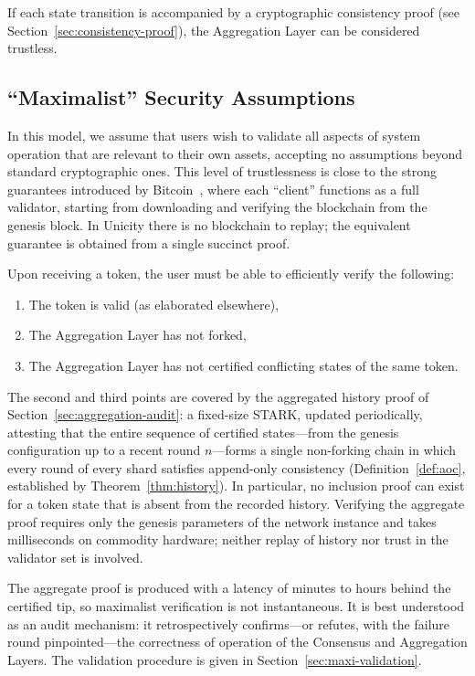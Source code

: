 \documentclass[twocolumn]{article}
\begin{document}
If each state transition is accompanied by a cryptographic consistency proof (see Section~\ref{sec:consistency-proof}), the Aggregation Layer can be considered trustless.


\subsection{``Maximalist'' Security Assumptions}
\label{sec:maximalist}

In this model, we assume that users wish to validate all aspects of system operation that are relevant to their own assets, accepting no assumptions beyond standard cryptographic ones. This level of trustlessness is close to the strong guarantees introduced by Bitcoin~\cite{bitcoin}, where each ``client'' functions as a full validator, starting from downloading and verifying the blockchain from the genesis block. In Unicity there is no blockchain to replay; the equivalent guarantee is obtained from a single succinct proof.

Upon receiving a token, the user must be able to efficiently verify the following:

\begin{enumerate}[nosep]
    \item The token is valid (as elaborated elsewhere),
    \item The Aggregation Layer has not forked,
    \item The Aggregation Layer has not certified conflicting states of the same token.
\end{enumerate}

The second and third points are covered by the aggregated history proof of Section~\ref{sec:aggregation-audit}: a fixed-size STARK, updated periodically, attesting that the entire sequence of certified states---from the genesis configuration up to a recent round $n$---forms a single non-forking chain in which every round of every shard satisfies append-only consistency (Definition~\ref{def:aoc}, established by Theorem~\ref{thm:history}). In particular, no inclusion proof can exist for a token state that is absent from the recorded history. Verifying the aggregate proof requires only the genesis parameters of the network instance and takes milliseconds on commodity hardware; neither replay of history nor trust in the validator set is involved.

The aggregate proof is produced with a latency of minutes to hours behind the certified tip, so maximalist verification is not instantaneous. It is best understood as an audit mechanism: it retrospectively confirms---or refutes, with the failure round pinpointed---the correctness of operation of the Consensus and Aggregation Layers. The validation procedure is given in Section~\ref{sec:maxi-validation}.
\end{document}
